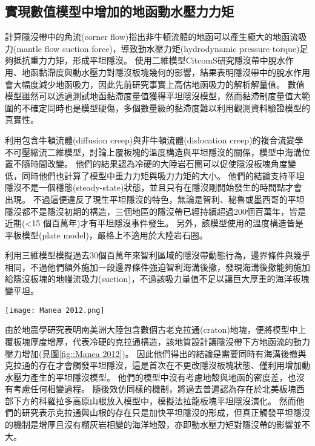 \subsection{實現數值模型中增加的地函動水壓力力矩}
\citealp{tovish1978mantle}計算隱沒帶中的角流(corner flow)指出非牛頓流體的地函可以產生極大的地函流吸力(mantle flow suction force)，導致動水壓力矩(hydrodynamic pressure torque)足夠抵抗重力力矩，形成平坦隱沒。
\citealp{Manea2007}使用二維模型CitcomS研究隱沒帶中脫水作用、地函黏滯度與動水壓力對隱沒板塊幾何的影響，結果表明隱沒帶中的脫水作用會大幅度減少地函吸力，因此先前研究事實上高估地函吸力的解析解量值。
數值模型雖然可以透過測試地函黏滯度量值獲得平坦隱沒模型，然而黏滯制度量值大範圍的不確定同時也是模型硬傷，多個數量級的黏滯度難以利用觀測資料驗證模型的真實性。

\citealp{Thermal2012}利用包含牛頓流體(diffusion creep)與非牛頓流體(dislocation creep)的複合流變學不可壓縮流二維模型，討論上覆板塊的溫度構造與平坦隱沒的關係，模型中海溝位置不隨時間改變。
他們的結果認為冷硬的大陸岩石圈可以促使隱沒板塊角度變低，同時他們也計算了模型中重力力矩與吸力力矩的大小。
他們的結論支持平坦隱沒不是一個穩態(steady-state)狀態，並且只有在隱沒剛開始發生的時間點才會出現。
不過這便違反了現生平坦隱沒的特色，無論是智利、秘魯或墨西哥的平坦隱沒都不是隱沒初期的構造，三個地區的隱沒帶已經持續超過200個百萬年，皆是近期(<15 個百萬年)才有平坦隱沒事件發生。
另外，該模型使用的溫度構造皆是平板模型(plate model)，嚴格上不適用於大陸岩石圈。

\citealp{Manea2012Chile}利用三維模型模擬過去30個百萬年來智利區域的隱沒帶動態行為，邊界條件與\citealp{Thermal2012}幾乎相同，不過他們額外施加一段邊界條件強迫智利海溝後撤，發現海溝後撤能夠施加給隱沒板塊的地幔流吸力(suction)，不過該吸力量值不足以讓巨大厚重的海洋板塊變平坦。
\begin{figure*}[ht!]
    \centering
    \texttt{[image: Manea 2012.png]}
    \caption{\citealp{Manea2012Chile}中的智利平坦隱沒模型，模型中同時加入海溝後撤與增厚大陸岩石圈可以讓平坦隱沒發育。
    }
    \label{fig::Manea 2012}
\end{figure*}
由於地震學研究表明南美洲大陸包含數個古老克拉通(craton)地塊，\citealp{Manea2012Chile}便將模型中上覆板塊厚度增厚，代表冷硬的克拉通構造，該地質設計讓隱沒帶下方地函流的動力壓力增加(見圖\ref{fig::Manea 2012})。
因此他們得出的結論是需要同時有海溝後撤與克拉通的存在才會觸發平坦隱沒，這是首次在不更改隱沒板塊狀態、僅利用增加動水壓力產生的平坦隱沒模型。
他們的模型中沒有考慮地殼與地函的密度差，也沒有考慮任何相變過程。
隨後\citealp{Liu2016}效仿同樣的機制，將過去普遍認為存在於北美板塊西部下方的科羅拉多高原山根放入模型中，模擬法拉龍板塊平坦隱沒演化。
然而他們的研究表示克拉通與山根的存在只是加快平坦隱沒的形成，但真正觸發平坦隱沒的機制是增厚且沒有榴灰岩相變的海洋地殼，亦即動水壓力矩對隱沒帶的影響並不大。


